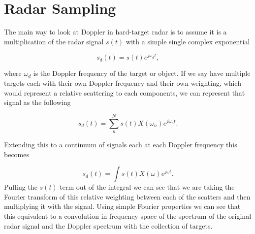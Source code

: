 \section{Radar Sampling}


The main way to look at Doppler in hard-target radar is to assume it is a multiplication of the radar signal $s(t)$ with a simple single complex exponential

\begin{equation}
\label{simpledop}
s_d(t) = s(t)e^{j\omega_d t},
\end{equation}
 
\noindent where $\omega_d$ is the Doppler frequency of the target or object.  If we say have multiple targets each with their own Doppler frequency and their own weighting, which would represent a relative scattering to each components,  we can represent that signal as the following

\begin{equation}
\label{multiDop}
\displaystyle s_d(t) = \sum_{n}^{N} s(t)X(\omega_n)e^{j\omega_{n} t}.
\end{equation}

\noindent Extending this to a continuum of signals each at each Doppler frequency this becomes

\begin{equation}
\label{conDop}
s_d(t) = \int s(t) X(\omega)e^{j\omega t}.
\end{equation}
\noindent Pulling the $s(t)$ term out of the integral we can see that we are taking the Fourier transform of this relative weighting between each of the scatters and then multiplying it with the signal.  Using simple Fourier properties we can see that this equivalent to a convolution in frequency space of the spectrum of the original radar signal and the Doppler spectrum with the collection of targets.  


